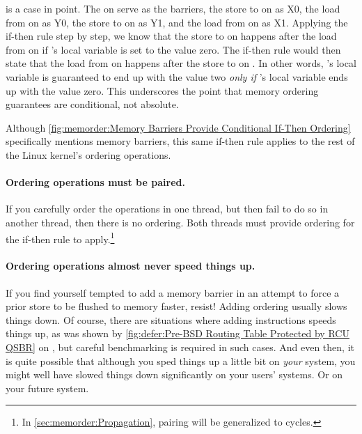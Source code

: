 \QuickQuizEnd

\begin{fcvref}
is a case in point.
The  on  serve as the barriers,
the store to  on  as X0, the load from 
on  as Y0, the store to  on  as Y1,
and the load from  on  as X1.
Applying the if-then rule step by step, we know that the store to
 on  happens after the load from  on  if
's local variable  is set to the value zero.
The if-then rule would then state that the load from  on
 happens after the store to  on .
In other words,
's local variable  is guaranteed
to end up with the value two \emph{only if}
's local variable  ends up with the value zero.
This underscores the point that memory ordering guarantees are
conditional, not absolute.
\end{fcvref}

Although
\cref{fig:memorder:Memory Barriers Provide Conditional If-Then Ordering}
specifically mentions memory barriers, this same if-then rule applies
to the rest of the Linux kernel's ordering operations.

\paragraph{Ordering operations must be paired.}
If you carefully order the operations in one thread, but then fail to do
so in another thread, then there is no ordering.
Both threads must provide ordering for the if-then rule to apply.\footnote{
	In \cref{sec:memorder:Propagation}, pairing will be
	generalized to cycles.}

\paragraph{Ordering operations almost never speed things up.}
If you find yourself tempted to add a memory barrier in an attempt
to force a prior store to be flushed to memory faster, resist!
Adding ordering usually slows things down.
Of course, there are situations where adding instructions speeds things
up, as was shown by
\cref{fig:defer:Pre-BSD Routing Table Protected by RCU QSBR} on
,
but careful benchmarking is required in such cases.
And even then, it is quite possible that although you sped things up
a little bit on \emph{your} system, you might well have slowed things
down significantly on your users' systems.
Or on your future system.

